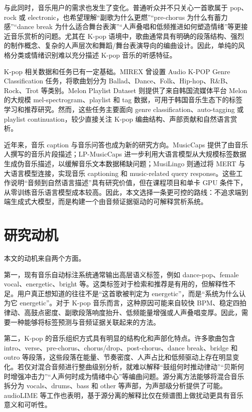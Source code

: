 \documentclass[UTF8,zihao=-4]{ctexart}
\begin{document}
与此同时，音乐用户的需求也发生了变化。普通听众并不只关心一首歌属于 pop、rock 或 electronic，也希望理解“副歌为什么更燃”“pre-chorus 为什么有蓄力感”“dance break 为什么适合舞台表演”“人声叠唱和低频推进如何塑造情绪”等更接近音乐赏析的问题。尤其在 K-pop 语境中，歌曲通常具有明确的段落结构、强烈的制作概念、复杂的人声层次和舞蹈/舞台表演导向的编曲设计。因此，单纯的风格分类或情绪识别难以充分描述 K-pop 音乐的听感特征。

K-pop 相关数据和任务已有一定基础。MIREX 曾设置 Audio K-POP Genre Classification 任务，将歌曲划分为 Ballad、Dance、Folk、Hip-hop、R\&B、Rock、Trot 等类别\cite{mirex2020kpop}。Melon Playlist Dataset 则提供了来自韩国流媒体平台 Melon 的大规模 mel-spectrogram、playlist 和 tag 数据，可用于韩国音乐生态下的标签学习和推荐研究\cite{ferraro2021melon}。然而，这些任务主要面向 genre classification、auto-tagging 或 playlist continuation，较少直接关注 K-pop 编曲结构、声部贡献和自然语言赏析。

近年来，音乐 caption 与音乐问答也成为新的研究方向。MusicCaps 提供了由音乐人撰写的音乐片段描述\cite{musiccaps2023}；LP-MusicCaps 进一步利用大语言模型从大规模标签数据生成伪音乐描述，以缓解音乐文本数据稀缺问题\cite{doh2023lpmusiccaps}；MusiLingo 则通过将 MERT 与大语言模型连接，实现音乐 captioning 和 music-related query response\cite{deng2023musilingo}。这些工作说明“音频到自然语言描述”具有研究价值，但在课程项目和单卡 GPU 条件下，从零训练音乐语言模型成本较高。因此，本文选择一条更可控的路线：不追求端到端生成式大模型，而是构建一个由音频证据驱动的可解释赏析系统。

\section{研究动机}

本文的动机来自两个方面。

第一，现有音乐自动标注系统通常输出高层语义标签，例如 dance-pop、female vocal、energetic、bright 等。这类标签对于检索和推荐是有用的，但解释性不足。用户真正想知道的往往不是“这首歌被判定为 energetic”，而是“系统为什么认为它 energetic”。对于 K-pop 音乐而言，这种原因可能来自较快 BPM、稳定四拍律动、高鼓点密度、副歌段落响度抬升、低频能量增强或人声叠唱变厚。因此，需要一种能够将标签预测与音频证据关联起来的方法。

第二，K-pop 的音乐组织方式具有明显的结构化和声部化特点。许多歌曲包含 intro、verse、pre-chorus、chorus/drop、post-chorus、dance break、bridge 和 outro 等段落，这些段落在能量、节奏密度、人声占比和低频驱动上存在明显变化。若仅对混合音频进行整曲级别分析，就难以解释“鼓组何时推动律动”“贝斯何时增强冲击力”“人声何时成为情绪中心”等编曲问题。源分离方法能够将混合音乐拆分为 vocals、drums、bass 和 other 等声部，为声部级分析提供了可能。audioLIME 等工作也表明，基于源分离的解释比仅在频谱图上做扰动更具有音乐意义和可听性\cite{haunschmid2020audiolime}。
\end{document}
